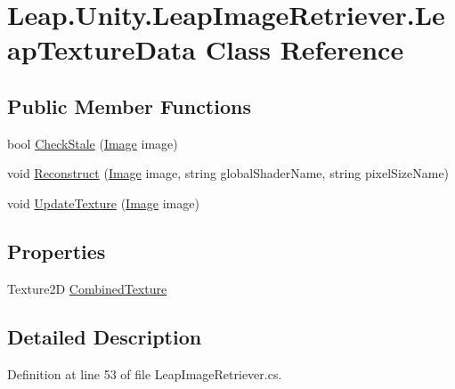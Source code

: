 \hypertarget{class_leap_1_1_unity_1_1_leap_image_retriever_1_1_leap_texture_data}{}\section{Leap.\+Unity.\+Leap\+Image\+Retriever.\+Leap\+Texture\+Data Class Reference}
\label{class_leap_1_1_unity_1_1_leap_image_retriever_1_1_leap_texture_data}
\subsection*{Public Member Functions}
\begin{DoxyCompactItemize}
\item 
bool \mbox{\hyperlink{class_leap_1_1_unity_1_1_leap_image_retriever_1_1_leap_texture_data_ae2a3b82b80076536da86b22001a1fa42}{Check\+Stale}} (\mbox{\hyperlink{class_leap_1_1_image}{Image}} image)
\item 
void \mbox{\hyperlink{class_leap_1_1_unity_1_1_leap_image_retriever_1_1_leap_texture_data_a35667966b1c45d70e49426c298e0e97a}{Reconstruct}} (\mbox{\hyperlink{class_leap_1_1_image}{Image}} image, string global\+Shader\+Name, string pixel\+Size\+Name)
\item 
void \mbox{\hyperlink{class_leap_1_1_unity_1_1_leap_image_retriever_1_1_leap_texture_data_a7a6260ccdc4ca472efb67a37184c6cd3}{Update\+Texture}} (\mbox{\hyperlink{class_leap_1_1_image}{Image}} image)
\end{DoxyCompactItemize}
\subsection*{Properties}
\begin{DoxyCompactItemize}
\item 
Texture2D \mbox{\hyperlink{class_leap_1_1_unity_1_1_leap_image_retriever_1_1_leap_texture_data_ae8cdced92ef3281e951cfa787fd40c80}{Combined\+Texture}}
\end{DoxyCompactItemize}


\subsection{Detailed Description}


Definition at line 53 of file Leap\+Image\+Retriever.\+cs.



